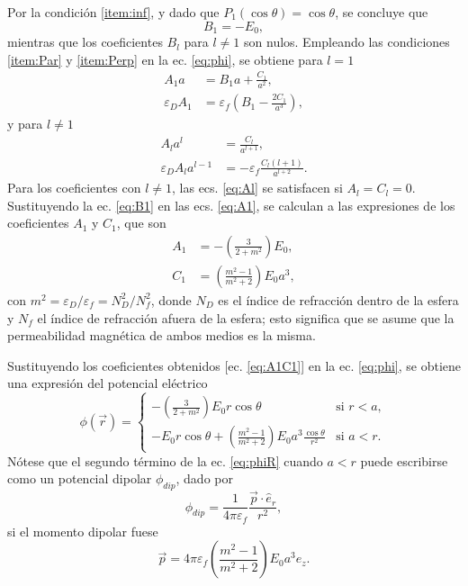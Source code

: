 \documentclass[letterpaper, 12pt] {article}
\begin{document}
Por la condición \ref{item:inf}, y dado que $P_1(\cos\theta)= \cos\theta$, se concluye que
	\begin{equation}
	B_1 = -E_0,\label{eq:B1}
	\end{equation} 
mientras que los coeficientes  $B_l$ para $l \not=1$ son nulos. Empleando las condiciones \ref{item:Par} y \ref{item:Perp} en la ec. \eqref{eq:phi}, se obtiene para $l = 1$
	\begin{subequations}
	\begin{align}
	A_1a &= B_1 a + \frac{C_1}{a^2}, \\
	\varepsilon_D A_1 & = \varepsilon_f \left( B_1 -\frac{2C_1}{a^3} \right),
	\end{align} \label{eq:A1}
	\end{subequations}	
y para $l \not= 1$
	\begin{subequations}
	\begin{align}
	A_la^l &= \frac{C_l}{a^{l+1}}, \\
	\varepsilon_D A_l a^{l-1} & = -\varepsilon_f \frac{C_l (l+1)}{a^{l+2}}. 
	\end{align} \label{eq:Al}
	\end{subequations}	
Para los coeficientes con $l \not= 1$, las ecs. \eqref{eq:Al} se satisfacen si $A_l = C_l = 0$. Sustituyendo la ec. \eqref{eq:B1} en las ecs. \eqref{eq:A1}, se calculan a las expresiones de los coeficientes $A_1$ y $C_1$, que son 
\begin{subequations}
\begin{align}
A_1 &= - \left( \frac{3}{2+m^2} \right) E_0,\\
C_1 &= \left(\frac{m^2-1}{m^2+2}  \right) E_0 a^3,
\end{align}\label{eq:A1C1}
\end{subequations}
con $m^2 = \varepsilon_D / \varepsilon_f = N_D^2/N_f^2$, donde $N_D$ es el índice de refracción dentro de la esfera y $N_f$ el índice de refracción afuera de la esfera; esto significa que se asume que la permeabilidad magnética de ambos medios es la misma.

Sustituyendo los coeficientes obtenidos [ec. \eqref{eq:A1C1}] en la ec. \eqref{eq:phi}, se obtiene una expresión del potencial eléctrico
\begin{equation}
\phi (\vec{r}) = \left\{ 
	\begin{array}{ll}
	- \left( \frac{3}{2+m^2} \right) E_0r\cos\theta& \mbox{si } r<a,\\
	-  E_0r\cos\theta + \left(\frac{m^2-1}{m^2+2}\right) E_0 a^3 \frac{\cos\theta}{r^2} &\mbox{si }  a<r.
	\end{array} \right.\label{eq:phiR}
\end{equation}
Nótese que el segundo término de la ec. \eqref{eq:phiR} cuando $a<r$ puede escribirse como un potencial dipolar ${\phi}_{dip}$, dado por
\begin{equation}
\phi_{dip} = \frac{1}{4\pi\varepsilon_f } \frac{\vec{p}\cdot\hat{e}_r}{r^2},
\end{equation}
si el momento dipolar fuese
\begin{equation}
\vec{p} = 4\pi\varepsilon_f \left(\frac{m^2-1}{m^2+2}\right)E_0 a^3 \hat{e}_z.
\end{equation}
\end{document}
